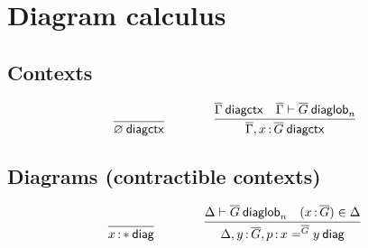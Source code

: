 

\section{Diagram calculus}

\subsection{Contexts}

\begin{small}
  \[
  \infer{\wfdiagctx{\emptyctx}}{}
  \qquad\qquad
  \infer
  {\wfdiagctx{\diag\Gamma,\tptm{x}{\diag G}}}
  {\wfdiagctx{\diag\Gamma} & \wfdiaglob{\diag\Gamma}{\diag G}n}\]
\end{small}

\subsection{Diagrams (contractible contexts)}

\begin{small}
  \[
  \infer{\wfdiag{\tptm{x}{\diagbase}}}{}
  \qquad\qquad
  \infer{\wfdiag{\Delta,\tptm{y}{\diag G},\tptm{p}{\homj{\diag{G}}{x}{y}}}}
  {\wfdiaglob{\Delta}{\diag G}n
    & (\tptm{x}{\diag{G}}) \in \Delta}\]
\end{small}

